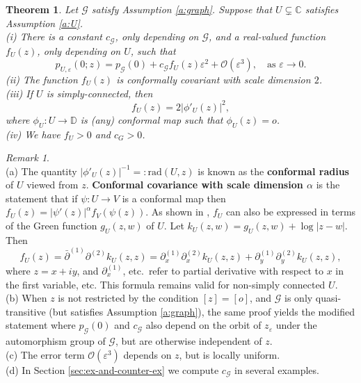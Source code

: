 \documentclass[11pt]{article}
\newtheorem{theorem}{Theorem}[section]
\theoremstyle{remark}
\newtheorem{remark}{Remark}
\def\eps{\varepsilon}
\def\C{\mathbb{C}}
\def\D{\mathbb{D}}
\def\cG{\mathcal{G}}
\def\rad{\mathrm{rad}}
\newcommand{\eqn}[2]{\begin{equation}\label{#1}#2\end{equation}}
\begin{document}
\begin{theorem}
\label{thm:scaling-form}
Let $\cG$ satisfy Assumption \ref{a:graph}.  
Suppose that $U \subsetneq \C$ satisfies Assumption \ref{a:U}. \\
(i) There is a constant $c_\cG$, only depending on $\cG$, and a real-valued function $f_U(z)$, only depending on $U$, such that
\eqn{e:asymp-formula}
{ p_{U,\eps}(0;z)
  = p_\cG(0) + c_\cG f_U(z) \eps^2 + \mathcal{O}(\eps^3), \quad \text{as $\eps \to 0$.} }
(ii) The function $f_U(z)$ is conformally covariant with scale dimension $2$. \\
(iii) If $U$ is simply-connected, then
\eqn{e:conf-rad}
{ f_U(z)
  = 2 |\phi'_U(z)|^{2}, }
where $\phi_U : U \to \D$ is (any) conformal map such that $\phi_U(z) = o$. \\
(iv) We have $f_U > 0$ and $c_G > 0$. 
\end{theorem}

\begin{remark} \ \\
(a) The quantity $|\phi'_U(z)|^{-1} =: \rad(U,z)$ is known as the \textbf{conformal radius} 
of $U$ viewed from $z$. \textbf{Conformal covariance with scale dimension $\alpha$} is the
statement that if $\psi : U \to V$ is a conformal map then 
$f_U(z) = |\psi'(z)|^{\alpha} f_V(\psi(z))$. As shown in \cite{A-CR25}, $f_U$ can also be 
expressed in terms of the Green function $g_U(z,w)$ of $U$. Let 
$k_U(z,w) = g_U(z,w) + \log|z-w|$. Then 
\[ f_U(z)
   = \bar{\partial}^{(1)} \partial^{(2)} k_U(z,z)
   = \partial^{(1)}_x \partial^{(2)}_x k_U(z,z) 
     + \partial^{(1)}_y \partial^{(2)}_y k_U(z,z), \]
where $z = x + i y$, and $\partial^{(1)}_x$, etc.~refer to partial derivative with respect to
$x$ in the first variable, etc. This formula remains valid for non-simply connected $U$.\\
(b) When $z$ is not restricted by the condition $[z]=[o]$, and $\cG$ is only quasi-transitive
(but satisfies Assumption \ref{a:graph}), the same proof yields the modified statement where $p_\cG(0)$ and $c_\cG$ also depend on the orbit of $z_\eps$ under the automorphism
group of $\cG$, but are otherwise independent of $z$. \\
(c) The error term $\mathcal{O}(\eps^3)$ depends on $z$, but is locally uniform. \\
(d) In Section \ref{sec:ex-and-counter-ex} we compute $c_\cG$ in several examples. 
\end{remark}
\end{document}
